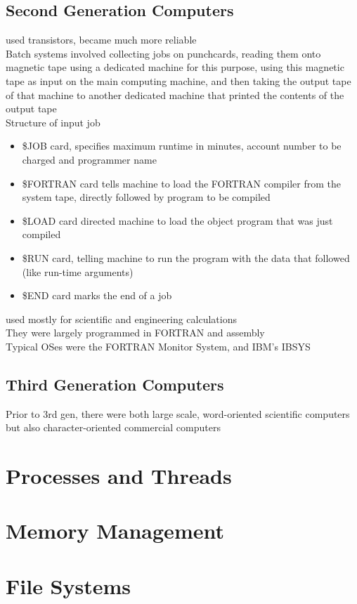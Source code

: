 \documentclass{article}
\begin{document}
\subsection*{Second Generation Computers}
used transistors, became much more reliable
\\Batch systems involved collecting jobs on punchcards, reading them onto magnetic tape using a dedicated machine for this purpose, using this magnetic tape as input on the main computing machine, and then taking the output tape of that machine to another dedicated machine that printed the contents of the output tape
\\Structure of input job
\begin{itemize}
	\item \$JOB card, specifies maximum runtime in minutes, account number to be charged and programmer name
	\item \$FORTRAN card tells machine to load the FORTRAN compiler from the system tape, directly followed by program to be compiled
	\item \$LOAD card directed machine to load the object program that was just compiled
	\item \$RUN card, telling machine to run the program with the data that followed (like run-time arguments)
	\item \$END card marks the end of a job
\end{itemize}
used mostly for scientific and engineering calculations
\\They were largely programmed in FORTRAN and assembly
\\Typical OSes were the FORTRAN Monitor System, and IBM's IBSYS
\subsection*{Third Generation Computers}
Prior to 3rd gen, there were both large scale, word-oriented scientific computers but also character-oriented commercial computers
\section{Processes and Threads}

\section{Memory Management}

\section{File Systems}
\end{document}
